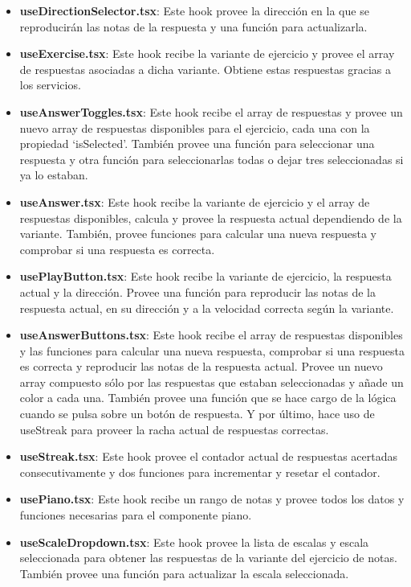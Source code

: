 \documentclass[12pt,twoside,titlepage]{report}
\begin{document}
\begin{itemize}
    \item \textbf{useDirectionSelector.tsx}: Este hook provee la dirección en la que se reproducirán las notas de la respuesta y una función para actualizarla.
    \item \textbf{useExercise.tsx}: Este hook recibe la variante de ejercicio y provee el array de respuestas asociadas a dicha variante. Obtiene estas respuestas gracias a los servicios.
    \item \textbf{useAnswerToggles.tsx}: Este hook recibe el array de respuestas y provee un nuevo array de respuestas disponibles para el ejercicio, cada una con la propiedad ‘isSelected’. También provee una función para seleccionar una respuesta y otra función para seleccionarlas todas o dejar tres seleccionadas si ya lo estaban.
    \item \textbf{useAnswer.tsx}: Este hook recibe la variante de ejercicio y el array de respuestas disponibles, calcula y provee la respuesta actual dependiendo de la variante. También, provee funciones para calcular una nueva respuesta y comprobar si una respuesta es correcta.
    \item \textbf{usePlayButton.tsx}: Este hook recibe la variante de ejercicio, la respuesta actual y la dirección. Provee una función para reproducir las notas de la respuesta actual, en su dirección y a la velocidad correcta según la variante.
    \item \textbf{useAnswerButtons.tsx}: Este hook recibe el array de respuestas disponibles y las funciones para calcular una nueva respuesta, comprobar si una respuesta es correcta y reproducir las notas de la respuesta actual. Provee un nuevo array compuesto sólo por las respuestas que estaban seleccionadas y añade un color a cada una. También provee una función que se hace cargo de la lógica cuando se pulsa sobre un botón de respuesta. Y por último, hace uso de useStreak para proveer la racha actual de respuestas correctas.
    \item \textbf{useStreak.tsx}: Este hook provee el contador actual de respuestas acertadas consecutivamente y dos funciones para incrementar y resetar el contador.
    \item \textbf{usePiano.tsx}: Este hook recibe un rango de notas y provee todos los datos y funciones necesarias para el componente piano.
    \item \textbf{useScaleDropdown.tsx}: Este hook provee la lista de escalas y escala seleccionada para obtener las respuestas de la variante del ejercicio de notas. También provee una función para actualizar la escala seleccionada.
\end{itemize}
\end{document}
